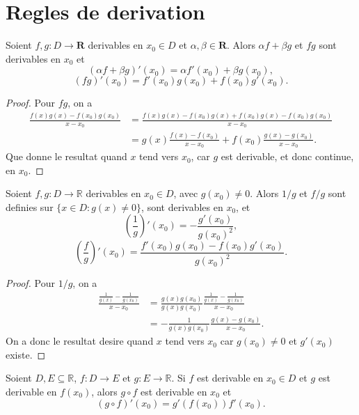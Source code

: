 \section{Regles de derivation}


\begin{theorem}
Soient $f,g:D\to \mathbf{R}$ derivables en $x_{0}\in D$ et $\alpha,\beta \in \mathbf{R}$. Alors $\alpha f+\beta g$ et $fg$ sont derivables en $x_{0}$ et 
$$
(\alpha f+\beta g)'(x_{0})=\alpha f'(x_{0})+\beta g(x_{0}),
$$
$$
(fg)'(x_{0})=f'(x_{0})g(x_{0})+f(x_{0})g'(x_{0}).
$$
\end{theorem}
\begin{proof}
Pour $fg$, on a
\begin{align*}
\frac{f(x)g(x)-f(x_{0})g(x_{0})}{x-x_{0}} & =\frac{f(x)g(x)-f(x_{0})g(x)+f(x_{0})g(x)-f(x_{0})g(x_{0})}{x-x_{0}} \\
 & =g(x) \frac{f(x)-f(x_{0})}{x-x_{0}}+f(x_{0}) \frac{g(x)-g(x_{0})}{x-x_{0}}.
\end{align*}
Que donne le resultat quand $x$ tend vers $x_{0}$, car $g$ est derivable, et donc continue, en $x_{0}$.
\end{proof}
\begin{theorem}[Quotients]
Soient $f,g:D\to \mathbb{R}$ derivables en $x_{0}\in D$, avec $g(x_{0})\neq 0$. Alors $1/g$ et $f/g$ sont definies sur $\{ x \in D:g(x)\neq 0 \}$, sont derivables en $x_{0}$, et 
$$
\left( \frac{1}{g} \right)'(x_{0})=-\frac{g'(x_{0})}{g(x_{0})^{2}},
$$
$$
\left( \frac{f}{g} \right)'(x_{0})=\frac{f'(x_{0})g(x_{0})-f(x_{0})g'(x_{0})}{g(x_{0})^{2}}.
$$
\end{theorem}
\begin{proof}
Pour $1/g$, on a
\begin{align*}
\frac{\frac{1}{g(x)}-\frac{1}{g(x_{0})}}{x-x_{0}} & = \frac{g(x)g(x_{0})}{g(x)g(x_{0})} \frac{\frac{1}{g(x)}-\frac{1}{g(x_{0})}}{x-x_{0}} \\
 & =-\frac{1}{g(x)g(x_{0})} \frac{g(x)-g(x_{0})}{x-x_{0}}.
\end{align*}
On a donc le resultat desire quand $x$ tend vers $x_{0}$ car $g(x_{0})\neq 0$ et $g'(x_{0})$ existe. 
\end{proof}
\begin{theorem}
Soient $D,E\subseteq \mathbb{R}$, $f:D\to E$ et $g:E\to \mathbb{R}$. Si $f$ est derivable en $x_{0}\in D$ et $g$ est derivable en $f(x_{0})$, alors $g \circ f$ est derivable en $x_{0}$ et 
$$
(g\circ f)'(x_{0})=g'(f(x_{0}))f'(x_{0}).
$$
\end{theorem}
